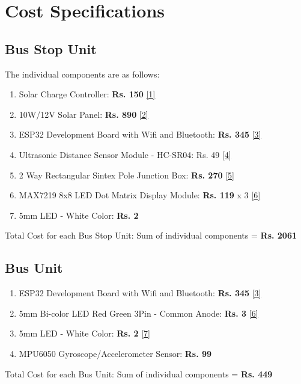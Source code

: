 \section{Cost Specifications}

\subsection{Bus Stop Unit}
The individual components are as follows:
\begin{enumerate}

    \item Solar Charge Controller: \textbf{Rs. 150} \hyperlink{page.36}{[1]}
    \item 10W/12V Solar Panel: \textbf{Rs. 890} \hyperlink{page.36}{[2]}
    \item ESP32 Development Board with Wifi and Bluetooth: \textbf{Rs. 345} \hyperlink{page.36}{[3]}
    \item Ultrasonic Distance Sensor Module - HC-SR04: Rs. 49 \hyperlink{page.36}{[4]}
    \item 2 Way Rectangular Sintex Pole Junction Box: \textbf{Rs. 270} \hyperlink{page.36}{[5]}
    \item MAX7219 8x8 LED Dot Matrix Display Module:\textbf{ Rs. 119} x 3 \hyperlink{page.36}{[6]}
    \item 5mm LED - White Color: \textbf{Rs. 2}
\end{enumerate}
Total Cost for each Bus Stop Unit: Sum of individual components = \textbf{Rs. 2061}
\subsection{Bus Unit}
\begin{enumerate}
    \item ESP32 Development Board with Wifi and Bluetooth:\textbf{ Rs. 345} \hyperlink{page.36}{[3]}
    \item 5mm Bi-color LED Red Green 3Pin - Common Anode: \textbf{Rs. 3} \hyperlink{page.36}{[6]} 
    \item 5mm LED - White Color: \textbf{Rs. 2} \hyperlink{page.36}{[7]}
    \item MPU6050 Gyroscope/Accelerometer Sensor: \textbf{Rs. 99}
\end{enumerate}
Total Cost for each Bus Unit: Sum of individual components = \textbf{Rs. 449}